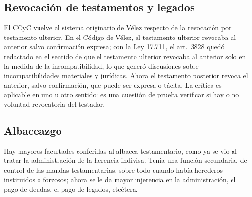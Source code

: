 \documentclass[12pt,oneside]{book}
\begin{document}
\subsection{Revocación de testamentos y legados}

El CCyC vuelve al sistema originario de Vélez respecto de la revocación por testamento ulterior. En el Código de Vélez, el testamento ulterior revocaba al anterior salvo confirmación expresa; con la Ley 17.711, el art.~3828 quedó redactado en el sentido de que el testamento ulterior revocaba al anterior solo en la medida de la incompatibilidad, lo que generó discusiones sobre incompatibilidades materiales y jurídicas. Ahora el testamento posterior revoca el anterior, salvo confirmación, que puede ser expresa o tácita. La crítica es aplicable en uno u otro sentido: es una cuestión de prueba verificar si hay o no voluntad revocatoria del testador.

\subsection{Albaceazgo}

Hay mayores facultades conferidas al albacea testamentario, como ya se vio al tratar la administración de la herencia indivisa. Tenía una función secundaria, de control de las mandas testamentarias, sobre todo cuando había herederos instituidos o forzosos; ahora se le da mayor injerencia en la administración, el pago de deudas, el pago de legados, etcétera.
\end{document}
